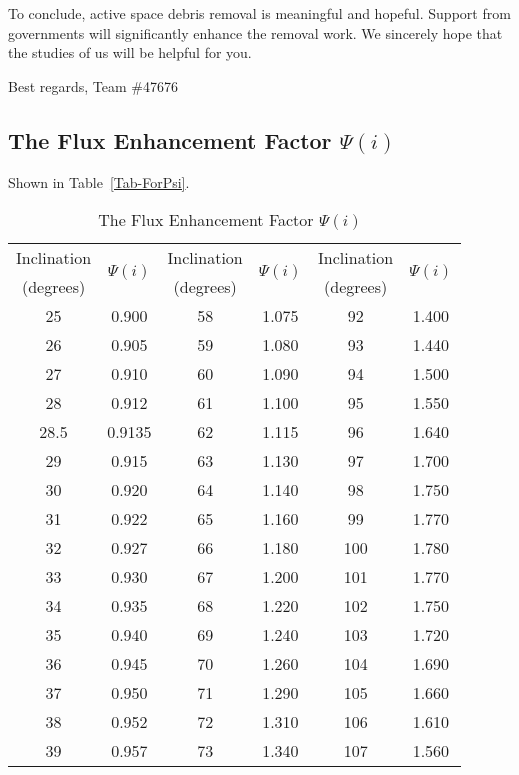 \documentclass{mcmthesis}
\begin{document}
	To conclude, active space debris removal is meaningful and hopeful. Support from governments will significantly enhance the removal work. We sincerely hope that the studies of us will be helpful for you.
	
	Best regards,
	Team \#47676
	
	\newpage
	
	\begin{appendices}
		
		\section{The Flux Enhancement Factor $\Psi(i)$}\label{Sec-Appendix1}
		
		Shown in Table~\ref{Tab-ForPsi}.
		
		\begin{table}[htbp]
			\centering
			\caption{The Flux Enhancement Factor $\Psi(i)$~\cite{flux}}
			\begin{tabular}{cccccc}
				\hline
				Inclination & \multirow{2}{*}{$\Psi(i)$} & Inclination & \multirow{2}{*}{$\Psi(i)$} & Inclination & \multirow{2}{*}{$\Psi(i)$} \\
				(degrees) &  & (degrees) &  & (degrees) &  \\
				\hline
				\hline
				25 & 0.900 & 58 & 1.075 & 92 & 1.400 \\
				26 & 0.905 & 59 & 1.080 & 93 & 1.440 \\
				27 & 0.910 & 60 & 1.090 & 94 & 1.500 \\
				28 & 0.912 & 61 & 1.100 & 95 & 1.550 \\
				28.5 & 0.9135 & 62 & 1.115 & 96 & 1.640 \\
				29 & 0.915 & 63 & 1.130 & 97 & 1.700 \\
				30 & 0.920 & 64 & 1.140 & 98 & 1.750 \\
				31 & 0.922 & 65 & 1.160 & 99 & 1.770 \\
				32 & 0.927 & 66 & 1.180 & 100 & 1.780 \\
				33 & 0.930 & 67 & 1.200 & 101 & 1.770 \\
				34 & 0.935 & 68 & 1.220 & 102 & 1.750 \\
				35 & 0.940 & 69 & 1.240 & 103 & 1.720 \\
				36 & 0.945 & 70 & 1.260 & 104 & 1.690 \\
				37 & 0.950 & 71 & 1.290 & 105 & 1.660 \\
				38 & 0.952 & 72 & 1.310 & 106 & 1.610 \\
				39 & 0.957 & 73 & 1.340 & 107 & 1.560 \\

\end{tabular}
\end{table}
\end{appendices}
\end{document}
